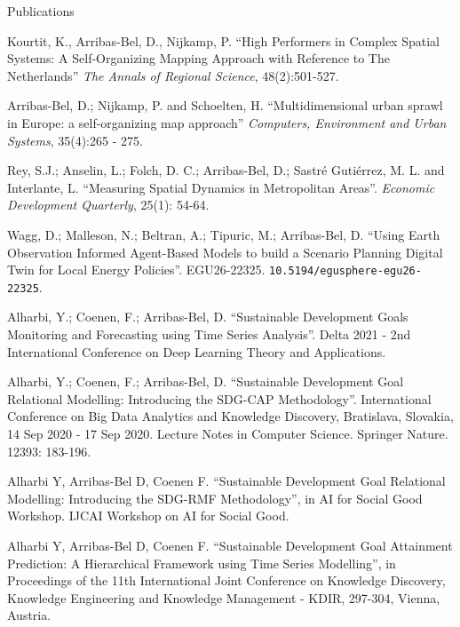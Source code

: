 \documentclass[12pt,2up]{article}
\begin{document}
\begin{cv}{}
\begin{cvlist}{Publications}
\item[] Kourtit, K., Arribas-Bel, D.,
    Nijkamp, P. ``High Performers in Complex Spatial Systems: A
    Self-Organizing Mapping Approach with Reference to The Netherlands''
    \emph{The Annals of Regional Science}, 48(2):501-527.

\item[2011] Arribas-Bel, D.; Nijkamp, P. and Schoelten, H. ``Multidimensional urban
    sprawl in Europe: a self-organizing map
    approach'' \emph{Computers, Environment and Urban Systems}, 35(4):265 -
    275.

\item[] Rey, S.J.; Anselin, L.; Folch, D. C.; Arribas-Bel, D.;
    Sastr\'{e} Guti\'{e}rrez, M. L.  and Interlante, L. ``Measuring Spatial
    Dynamics in Metropolitan Areas''. \emph{Economic Development
    Quarterly}, 25(1): 54-64.

\item[\textbf{Conference Proceedings}]
\item[\textit{2026}] 
    Wagg, D.; Malleson, N.; Beltran, A.; Tipuric, M.; Arribas-Bel, D.
    ``Using Earth Observation Informed Agent-Based Models to build a Scenario
    Planning Digital Twin for Local Energy Policies''.
    EGU26-22325. \texttt{10.5194/egusphere-egu26-22325}.
\item[\textit{2021}] 
    Alharbi, Y.; Coenen, F.; Arribas-Bel, D. ``Sustainable Development Goals
    Monitoring and Forecasting using Time Series Analysis''. Delta 2021 - 2nd
    International Conference on Deep Learning Theory and Applications.

\item[\textit{2020}] 
    Alharbi, Y.; Coenen, F.; Arribas-Bel, D. ``Sustainable Development Goal
    Relational Modelling: Introducing the SDG-CAP Methodology''. International
    Conference on Big Data Analytics and Knowledge Discovery, Bratislava,
    Slovakia, 14 Sep 2020 - 17 Sep 2020. Lecture Notes in Computer Science.
    Springer Nature. 12393: 183-196.
\item[] 
    Alharbi Y, Arribas-Bel D, Coenen F. ``Sustainable Development Goal
    Relational Modelling: Introducing the SDG-RMF Methodology'', in AI for
    Social Good Workshop. IJCAI Workshop on AI for Social Good.

\item[\textit{2019}] 
    Alharbi Y, Arribas-Bel D, Coenen F. 
    ``Sustainable Development Goal Attainment Prediction: A Hierarchical
    Framework using Time Series Modelling'', in Proceedings of the 11th
    International Joint Conference on Knowledge Discovery, Knowledge
    Engineering and Knowledge Management - KDIR, 297-304, Vienna,
    Austria.


\end{cvlist}
\end{cv}
\end{document}
